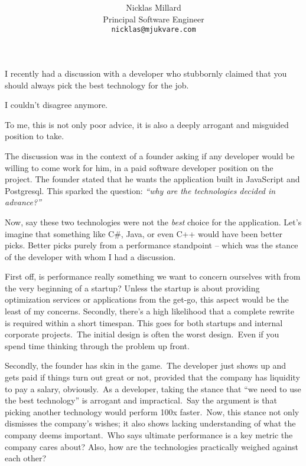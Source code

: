\documentclass{article}
\title{
    \sffamily{Why `Pick the Best Technology' is Poor and Impractical Advice} \\
    \vspace{0.5cm}
    \normalfont\large{\centering{
        Talent Pool, Collaborative Scalability, Documentation, and Community Are Perhaps Better
        Metrics
    }}
}
\author{
    \sffamily Nicklas Millard \\
    \sffamily Principal Software Engineer \\
    \texttt{nicklas@mjukvare.com}
}
\begin{document}
    \maketitle
    
    I recently had a discussion with a developer who stubbornly claimed that you should always pick the 
    best technology for the job.

    I couldn't disagree anymore.
    
    To me, this is not only poor advice, it is also a deeply arrogant and misguided position to take.

    The discussion was in the context of a founder asking if any developer would be willing to come work for him, in a paid
    software developer position on the project.
    The founder stated that he wants the application built in JavaScript and Postgresql. This sparked the 
    question: \textit{``why are the technologies decided in advance?''}
    
    Now, say these two technologies were not the \textit{best} choice for the application. 
    Let's imagine that something like C\#, Java, or even C++ would have been better picks. 
    Better picks purely from a performance standpoint – which was the stance of the developer with whom I had a discussion.
    
    First off, is performance really something we want to concern ourselves with from the very beginning of a startup?
    Unless the startup is about providing optimization services or applications from the get-go, this aspect would 
    be the least of my concerns.
    Secondly, there's a high likelihood that a complete rewrite is required within a short timespan. 
    This goes for both startups and internal corporate projects.\ The initial design is often the worst design.\ Even if you
    spend time thinking through the problem up front.
    
    Secondly, the founder has skin in the game.\ The developer just shows up and gets paid if things turn out great or not,
    provided that the company has liquidity to pay a salary, obviously.\ As a developer, taking the stance that 
    ``we need to use the best technology'' is arrogant and impractical.\ Say the argument is that picking another technology
    would perform 100x faster.\ Now, this stance not only dismisses the company's wishes; it also shows lacking
    understanding of what the company deems important.\ Who says ultimate performance is a key metric the company cares
    about? Also, how are the technologies practically weighed against each other?
    
\end{document}
